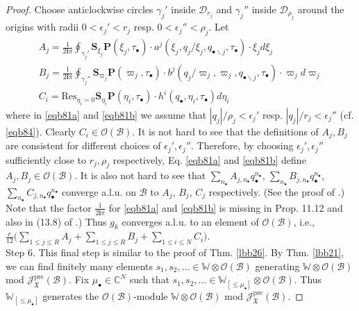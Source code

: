\documentclass[11pt,b5paper,notitlepage]{article}
\theoremstyle{definition}
\theoremstyle{plain}
\newcommand{\Res}{\mathrm{Res}}
\newcommand{\im}{\mathbf{i}}
\newcommand{\mbf}{\mathbf}
\newcommand{\blt}{\bullet}
\newcommand{\Wbb}{\mathbb W}
\newcommand{\Cbb}{\mathbb C}
\newcommand{\Sbf}{\mathbf{S}}
\newcommand{\<}{\left\langle}
\renewcommand{\>}{\right\rangle}
\newcommand{\MO}{\mathcal{O}}
\newcommand{\MB}{\mathcal{B}}
\newcommand{\fx}{\mathfrak{X}}
\newcommand{\SJ}{\mathscr{J}}
\newcommand{\MD}{\mathcal{D}}
\newcommand{\pre}{\mathrm{pre}}
\numberwithin{equation}{section}
\begin{document}
\begin{proof}
Choose anticlockwise circles $\gamma_j'$ inside $\MD_{r_j}$ and $\gamma_j''$ inside $\MD_{\rho_j}$ around the origins with radii $0<\epsilon_j'<r_j$ resp. $0<\epsilon_j''<\rho_j$. Let
\begin{subequations}\label{eqb81}
\begin{gather}
    \label{eqb81a}A_j=\frac{1}{2\im\pi}\oint\nolimits_{\gamma_j'} \Sbf_{\xi_j}\mbf P(\xi_j,\tau_\blt)\cdot a^j(\xi_j,q_j/\xi_j,q_{\blt\backslash j},\tau_\blt) \cdot \xi_j d\xi_j\\
    \label{eqb81b}B_j=\frac{1}{2\im\pi}\oint\nolimits_{\gamma_j''} \Sbf_{\varpi_j}\mbf P(\varpi_j,\tau_\blt)\cdot b^j(q_j/\varpi_j,\varpi_j,q_{\blt\backslash j},\tau_\blt)\cdot \varpi_j d\varpi_j\\
    \label{eqb81c}C_i=\Res_{\eta_i=0} \Sbf_{\eta_i} \mbf P(\eta_i,\tau_\blt)\cdot h^i(q_\blt,\eta_i,\tau_\blt)d\eta_i
\end{gather} 
\end{subequations}
where in \eqref{eqb81a} and \eqref{eqb81b} we assume that $|q_j|/\rho_j<\epsilon_j'$ resp. $|q_j|/r_j<\epsilon_j''$ (cf. \eqref{eqb84}). Clearly $C_i\in\MO(\MB)$. It is not hard to see that the definitions of $A_j,B_j$ are consistent for different choices of $\epsilon_j',\epsilon_j''$. Therefore, by choosing $\epsilon_j',\epsilon_j''$ sufficiently close to $r_j,\rho_j$ respectively, Eq. \eqref{eqb81a} and \eqref{eqb81b} define $A_j,B_j\in\MO(\MB)$. It is also not hard to see that $\sum_{n_\blt} A_{j,n_\blt}q_\blt^{n_\blt}$, $\sum_{n_\blt} B_{j,n_\blt}q_\blt^{n_\blt}$, $\sum_{n_\blt} C_{j,n_\blt}q_\blt^{n_\blt}$ converge a.l.u. on $\MB$ to $A_j$, $B_j$, $C_j$ respectively. (See the proof of \cite[Prop. 11.12]{Gui-sewingconvergence}.) Note that the factor $\frac 1{2\im\pi}$ for \eqref{eqb81a} and \eqref{eqb81b} is missing in Prop. 11.12 and also in (13.8) of \cite{Gui-sewingconvergence}.) Thus $g_k$ converges a.l.u. to an element of $\MO(\MB)$, i.e., $\frac{c}{12}\Big(\sum_{1\leq j\leq R} A_j+\sum_{1\leq j\leq R} B_j+\sum_{1\leq i\leq N}C_i\Big)$.\\[-1ex]




Step 6. This final step is similar to the proof of Thm. \ref{lbb26}. By Thm. \ref{lbb21}, we can find finitely many elements $s_1,s_2,\dots\in\Wbb\otimes\MO(\MB)$ generating $\Wbb\otimes\MO(\MB)$ mod $\SJ^\pre_\fx(\MB)$. Fix $\mu_\blt\in\Cbb^N$ such that $s_1,s_2,\dots\in\Wbb_{[\leq\mu_\blt]}\otimes\MO(\MB)$. Thus $\Wbb_{[\leq\mu_\blt]}$ generates the $\MO(\MB)$-module $\Wbb\otimes\MO(\MB)$ mod $\SJ^\pre_\fx(\MB)$.



\end{proof}
\end{document}

